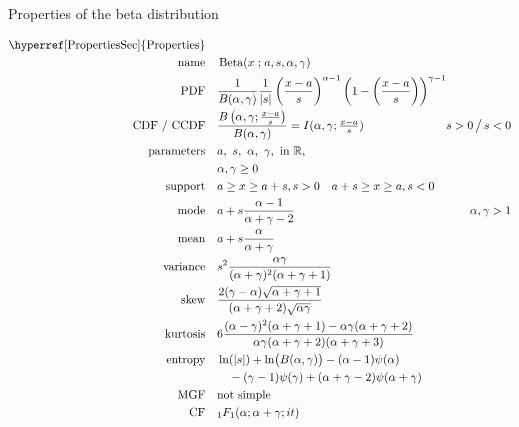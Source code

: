 

\begin{table*}[tp]
\caption[Beta distribution -- Properties]{Properties of the beta distribution}
 \begin{align*}
 \text{\hyperref[PropertiesSec]{Properties}}  \quad& \\
\text{name} \quad & \op{Beta}(x\given a,s,\alpha, \gamma) 	\checked
\\
\text{PDF}\quad &    \frac{1}{B(\alpha, \gamma)}\frac{1}{ \left|s\right|}
\left(\frac{x-a}{s} \right)^{\alpha -1} \left (1-\left(\frac{x-a}{s}\right)\right)^{\gamma -1}	\checked
\hspace{-8em}
\\
\text{CDF / CCDF} \quad  & 
 \frac{B\left( \alpha,\gamma; \sfrac{x-a}{s} \right)}{B(\alpha,\gamma)} = I( \alpha,\gamma; \sfrac{x-a}{s})
 \checked
& {s} >0 \,\big/ \, {s} <0
\\ 
\text{parameters}\quad &   a,\ s,\ \alpha,\ \gamma, \text{ in } \Real, \\ &  \alpha,\gamma\geq0	\checked
\\
\text{support} \quad &  a \geq x \geq a+s , s>0 \quad a+s \geq x \geq a , s<0 
\\
\text{mode} \quad  &a + s \frac{\alpha-1}{\alpha+\gamma-2}\checked  & \alpha,\gamma > 1
\\
\text{mean} \quad  &   a + s \frac{\alpha}{\alpha+\gamma}	\checked
\\
\text{variance} \quad   & s^2 \frac{\alpha\gamma}{(\alpha+\gamma)^2(\alpha+\gamma+1)} \checked
\\
\text{skew} \quad  &   \frac{2(\gamma-\alpha) \sqrt{\alpha+\gamma+1} }{(\alpha+\gamma+2)\sqrt{\alpha\gamma} } \checked
\\
\text{kurtosis} \quad  &  6\frac{(\alpha-\gamma)^2(\alpha+\gamma+1) - \alpha\gamma(\alpha+\gamma+2) }{\alpha\gamma(\alpha+\gamma+2)(\alpha+\gamma+3)} \checked
\\
\text{entropy} \quad  &  \ln(|s|) + \ln\bigl(B(\alpha,\gamma)\bigr)-(\alpha-1)\psi(\alpha)
\\ &\quad {}-(\gamma-1)\psi(\gamma)+(\alpha+\gamma-2)\psi(\alpha+\gamma) \checked
\\
\text{MGF} \quad  &  \text{not simple} 
\\
\text{CF} \quad  &  {}_{1}F_{1}(\alpha; \alpha+\gamma ; i t) \checked
\end{align*}
\end{table*}

